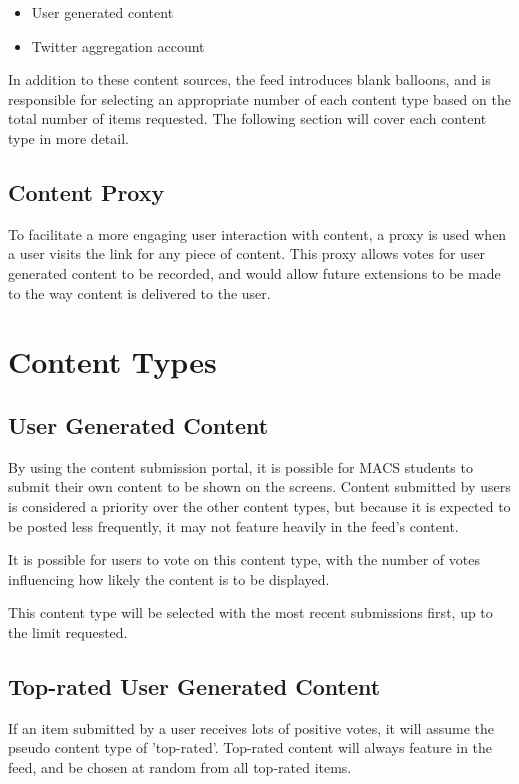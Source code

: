 \documentclass[11pt]{article}
\begin{document}
\begin{itemize}
	\item User generated content
	\item Twitter aggregation account
\end{itemize}

In addition to these content sources, the feed introduces blank balloons, and is responsible for selecting an appropriate number of each content type based on the total number of items requested. The following section will cover each content type in more detail.

\subsection{Content Proxy}
To facilitate a more engaging user interaction with content, a proxy is used when a user visits the link for any piece of content. This proxy allows votes for user generated content to be recorded, and would allow future extensions to be made to the way content is delivered to the user.

\section{Content Types}

\subsection{User Generated Content}
By using the content submission portal, it is possible for MACS students to submit their own content to be shown on the screens. Content submitted by users is considered a priority over the other content types, but because it is expected to be posted less frequently, it may not feature heavily in the feed's content.

It is possible for users to vote on this content type, with the number of votes influencing how likely the content is to be displayed.

This content type will be selected with the most recent submissions first, up to the limit requested.

\subsection{Top-rated User Generated Content}
If an item submitted by a user receives lots of positive votes, it will assume the pseudo content type of 'top-rated'. Top-rated content will always feature in the feed, and be chosen at random from all top-rated items.
\end{document}
